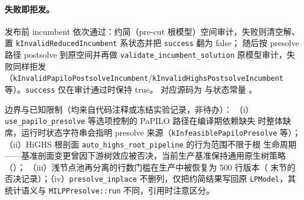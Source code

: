 \paragraph{失败即拒发。}
发布前 incumbent 依次通过：约简（pre-cut 根模型）空间审计，失败则清空解、
置 \texttt{kInvalidReducedIncumbent} 系状态并把 \texttt{success} 翻为 false；
随后按 presolve 路径 postsolve 到原空间并再做
\texttt{validate\_incumbent\_solution} 原模型审计，失败同样拒发
（\texttt{kInvalidPapiloPostsolveIncumbent}/\texttt{kInvalidHighsPostsolveIncumbent}
等）。\texttt{success} 仅在审计通过时保持 true。
对应源码为
与状态常量
。

\begin{boundarynote}
边界与已知限制（均来自代码注释或冻结实验记录，非待办）：
（i）\texttt{use\_papilo\_presolve} 等选项控制的 PaPILO 路径在编译期依赖缺失
时整体缺席，运行时状态字符串会指明 presolve 来源（\texttt{kInfeasiblePapiloPresolve}
等）；（ii）HiGHS 根剖面 \texttt{auto\_highs\_root\_pipeline} 的行为范围不限于根
生命周期——基准剖面变更曾因下游树效应被否决，当前生产基准保持通用原生树策略
（）；
（iii）浅节点池再分离的行数门槛在生产中被恢复为 500 行版本（
末节的否决记录）；（iv）\texttt{presolve\_inplace} 不删列，仅把约简结果写回原
\texttt{LPModel}，其统计语义与 \texttt{MILPPresolve::run} 不同，引用时注意区分。
\end{boundarynote}
